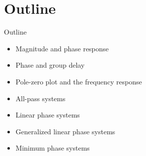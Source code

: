 \documentclass[10pt]{beamer}
\begin{document}
%
\section{Outline}
\begin{frame}{Outline}
\begin{itemize}
	\item Magnitude and phase response
	\item Phase and group delay
	\item Pole-zero plot and the frequency response
	\item All-pass systems
	\item Linear phase systems
	\item Generalized linear phase systems
	\item Minimum phase systems
\end{itemize}
\end{frame}
\end{document}
